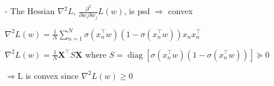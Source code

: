 

- The Hessian $\nabla^{2} L$, $\frac{\partial^{2}}{\partial w_{i} \partial w_{j}} L(w)$, is psd $\Rightarrow$ convex

$
\nabla^{2} L(w) 
=\frac{1}{N} \sum_{n=1}^{N} \sigma\left(x_{n}^{\top} w\right)\left(1-\sigma\left(x_{n}^{\top} w\right)\right) x_{n} x_{n}^{\top}
$

$
\nabla^{2} L(w)=\frac{1}{N} \mathbf{X}^{\top} S \mathbf{X} \text { where } S=\operatorname{diag}\left[\sigma\left(x_{n}^{\top} w\right)\left(1-\sigma\left(x_{n}^{\top} w\right)\right)\right] \succcurlyeq 0
$

$\Rightarrow \mathrm{L}$ is convex since $\nabla^{2} L(w) \geqslant 0$



